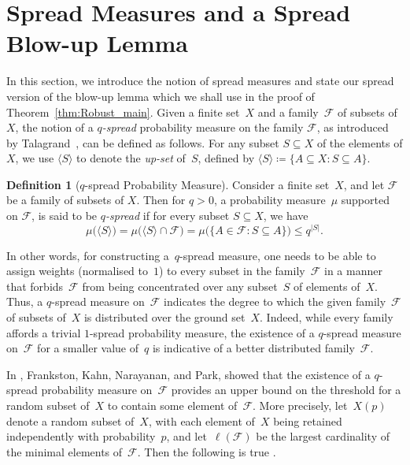 \documentclass[final]{article}
\theoremstyle{definition}
\newtheorem{definition}[theorem]{Definition}
\begin{document}
\section{Spread Measures and a Spread Blow-up Lemma}
\label{sec:robust}

In this section, we introduce the notion of spread measures and state our spread version of the blow-up lemma which we shall use in the proof of Theorem~\ref{thm:Robust_main}. Given a finite set~$X$ and a family~$\mathcal{F}$ of subsets of $X$, the notion of a \emph{$q$-spread} probability measure on the family $\mathcal{F}$, as introduced by Talagrand~\cite{talagrand_spread_measure}, can be defined as follows. For any subset $S \subseteq X$ of the elements of $X$, we use $\langle S \rangle$ to denote the \emph{up-set} of~$S$, defined by $\langle S \rangle \coloneqq \{A \subseteq X : S \subseteq A\}$.

\begin{definition}[$q$-spread Probability Measure]
\label{defn:spread_measure}
    Consider a finite set\/~$X$, and let\/ $\mathcal{F}$ be a family of subsets of\/ $X$. Then for\/ $q > 0$, a probability measure\/~$\mu$ supported on\/ $\mathcal{F}$, is said to be \emph{$q$-spread} if for every subset\/ $S \subseteq X$, we have $$\mu\bigl(\langle S \rangle\bigr) = \mu\bigl(\langle S\rangle \cap \mathcal{F}\bigr) = \mu\bigl(\{A \in \mathcal{F}: S \subseteq A\}\bigr) \leq q^{|S|}.$$
\end{definition}

In other words, for constructing a~$q$-spread measure, one needs to be able to assign weights (normalised to~$1$) to every subset in the family~$\mathcal{F}$ in a manner that forbids~$\mathcal{F}$ from being concentrated over any subset~$S$ of elements of~$X$.  
Thus, a $q$-spread measure on~$\mathcal{F}$ indicates the degree to which the given family~$\mathcal{F}$ of subsets of~$X$ is distributed over the ground set~$X$. 
Indeed, while every family affords a trivial $1$-spread probability measure, the existence of a $q$-spread measure on~$\mathcal{F}$ for a smaller value of~$q$ is indicative of a better distributed family~$\mathcal{F}$.  

In \cite{FKNP_Fractional_Thresholds}, Frankston, Kahn, Narayanan, and Park, showed that the existence of a $q$-spread probability measure on~$\mathcal{F}$ provides an upper bound on the threshold for a random subset of~$X$ to contain some element of~$\mathcal{F}$. More precisely, let~$X(p)$ denote a random subset of~$X$, with each element of~$X$ being retained independently with probability~$p$, and let~$\ell(\mathcal{F})$ be the largest cardinality of the minimal elements of~$\mathcal{F}$. Then the following is true \cite[Theorem 1.6]{FKNP_Fractional_Thresholds}.
\end{document}
